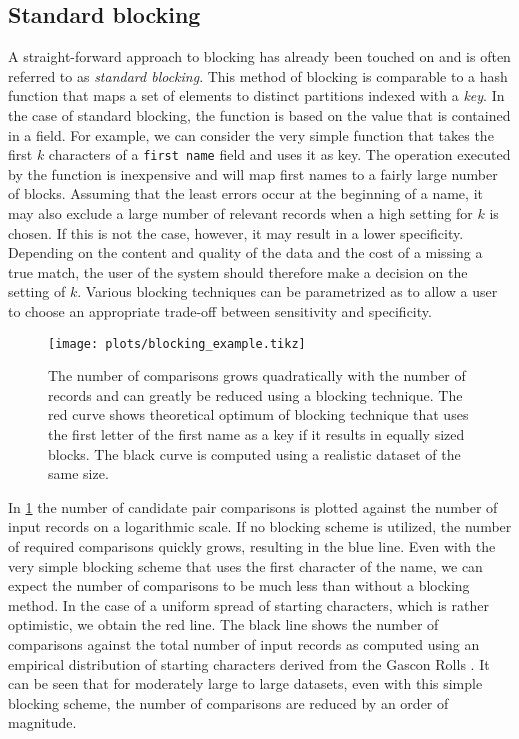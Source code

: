 

\subsection{Standard blocking}
\label{sec:standard_blocking}

A straight-forward approach to blocking has already been touched on and is often referred to as \emph{standard blocking}.
This method of blocking is comparable to a hash function that maps a set of elements to distinct partitions indexed with a \emph{key}.
In the case of standard blocking, the function is based on the value that is contained in a field.
For example, we can consider the very simple function that takes the first $k$ characters of a \texttt{first name} field and uses it as key.
The operation executed by the function is inexpensive and will map first names to a fairly large number of blocks.
Assuming that the least errors occur at the beginning of a name, it may also exclude a large number of relevant records when a high setting for $k$ is chosen.
If this is not the case, however, it may result in a lower specificity.
Depending on the content and quality of the data and the cost of a missing a true match, the user of the system should therefore make a decision on the setting of $k$.
Various blocking techniques can be parametrized as to allow a user to choose an appropriate trade-off between sensitivity and specificity.

\begin{figure}
    \centering
    \texttt{[image: plots/blocking\_example.tikz]}
    \caption{The number of comparisons grows quadratically with the number of records and can greatly be reduced using a blocking technique. The red curve shows theoretical optimum of blocking technique that uses the first letter of the first name as a key if it results in equally sized blocks. The black curve is computed using a realistic dataset of the same size.}
    \label{fig:blocking_example}
\end{figure}

In \cref{fig:blocking_example} the number of candidate pair comparisons is plotted against the number of input records on a logarithmic scale.
If no blocking scheme is utilized, the number of required comparisons quickly grows, resulting in the blue line.
Even with the very simple blocking scheme that uses the first character of the name, we can expect the number of comparisons to be much less than without a blocking method.
In the case of a uniform spread of starting characters, which is rather optimistic, we obtain the red line.
The black line shows the number of comparisons against the total number of input records as computed using an empirical distribution of starting characters derived from the Gascon Rolls \citep{GasconRolls}.
It can be seen that for moderately large to large datasets, even with this simple blocking scheme, the number of comparisons are reduced by an order of magnitude.

